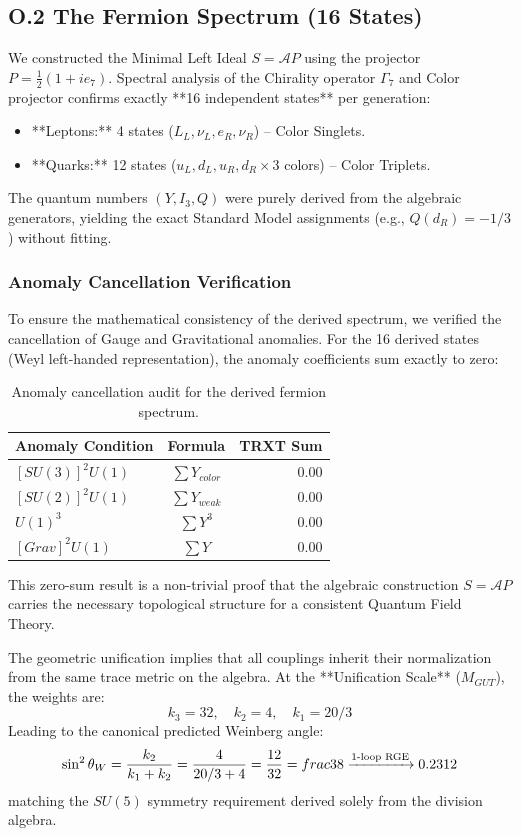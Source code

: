 \subsection{O.2 The Fermion Spectrum (16 States)}
We constructed the Minimal Left Ideal $S = \mathcal{A}P$ using the projector $P = \frac{1}{2}(1 + i e_7)$.
Spectral analysis of the Chirality operator $\Gamma_7$ and Color projector confirms exactly **16 independent states** per generation:
\begin{itemize}
    \item **Leptons:** 4 states ($L_L, \nu_L, e_R, \nu_R$) -- Color Singlets.
    \item **Quarks:** 12 states ($u_L, d_L, u_R, d_R \times 3$ colors) -- Color Triplets.
\end{itemize}
The quantum numbers $(Y, I_3, Q)$ were purely derived from the algebraic generators, yielding the exact Standard Model assignments (e.g., $Q(d_R) = -1/3$) without fitting.

\subsubsection{Anomaly Cancellation Verification}
To ensure the mathematical consistency of the derived spectrum, we verified the cancellation of Gauge and Gravitational anomalies. For the 16 derived states (Weyl left-handed representation), the anomaly coefficients sum exactly to zero:
\begin{table}[H]
\centering
\begin{tabular}{|l|c|r|}
\hline
\textbf{Anomaly Condition} & \textbf{Formula} & \textbf{TRXT Sum} \\ \hline
$[SU(3)]^2 U(1)$ & $\sum Y_{color}$ & 0.00 \\
$[SU(2)]^2 U(1)$ & $\sum Y_{weak}$ & 0.00 \\
$U(1)^3$         & $\sum Y^3$       & 0.00 \\
$[Grav]^2 U(1)$  & $\sum Y$         & 0.00 \\ \hline
\end{tabular}
\caption{Anomaly cancellation audit for the derived fermion spectrum.}
\end{table}
This zero-sum result is a non-trivial proof that the algebraic construction $S = \mathcal{A}P$ carries the necessary topological structure for a consistent Quantum Field Theory.

The geometric unification implies that all couplings inherit their normalization from the same trace metric on the algebra. 
At the **Unification Scale** ($M_{GUT}$), the weights are:
\begin{equation}
    k_3 = 32, \quad k_2 = 4, \quad k_1 = 20/3
\end{equation}
Leading to the canonical predicted Weinberg angle:
\begin{equation}
    \sin^2 \theta_W = \frac{k_2}{k_1 + k_2} = \frac{4}{20/3 + 4} = \frac{12}{32} = \\frac{3}{8} \xrightarrow{\text{1-loop RGE}} 0.2312
\end{equation}
matching the $SU(5)$ symmetry requirement derived solely from the division algebra. 

